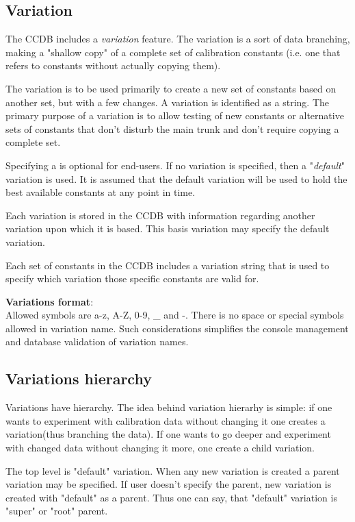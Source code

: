 \documentclass{article}
\begin{document}
\subsection{Variation}
The CCDB includes a \textit{variation} feature. The variation is a sort
of data branching, making a "shallow copy" of a complete set of calibration
constants (i.e. one that refers to constants without actually copying them).

The variation is to be used primarily to create a new set of constants based
on another set, but with a few changes. A variation is identified as a string.
The primary purpose of a variation is to allow testing of new constants or
alternative sets of constants that don't disturb the main trunk and don't
require copying a complete set.

Specifying a is optional for end-users. If no variation is specified, then a
"\textit{default}" variation is used. It is assumed that the default variation
will be used to hold the best available constants at any point in time.

Each variation is stored in the CCDB with information regarding another
variation upon which it is based. This basis variation may specify the default variation.

Each set of constants in the CCDB includes a variation string that is used to
specify which variation those specific constants are valid for.

\textbf{Variations format}:\\
Allowed symbols are a-z, A-Z, 0-9, \_ and -. There is no space or special symbols
allowed in variation name. Such considerations simplifies the console management
and database validation of variation names.

\subsection{Variations hierarchy}\label{sec:variations_hierarchy}

Variations have hierarchy. The idea behind variation hierarhy is simple:
if one wants to experiment with calibration data without changing it
one creates a variation(thus branching the data). If one wants to go deeper
and experiment with changed data without changing it more, one create a child variation. 

The top level is "default" variation.
When any new variation is created a parent variation may be specified. 
If user doesn't specify the parent, new variation is created with "default" as
a parent. Thus one can say, that "default" variation is "super" or "root" parent. 
\end{document}

